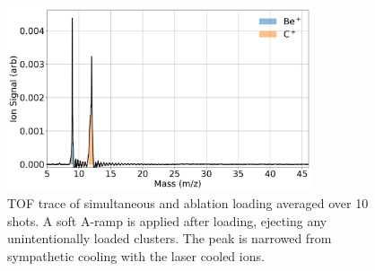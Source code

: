 \begin{figure}[H]
	\centering
	\includegraphics[width=0.8\textwidth]{images/Be_C_TOF.png}
	\caption{TOF trace of simultaneous  and  ablation loading averaged over 10 shots. A soft A-ramp is applied after loading, ejecting any unintentionally loaded  clusters. The  peak is narrowed from sympathetic cooling with the laser cooled  ions.}
	\label{fig: Be C TOF}
\end{figure}